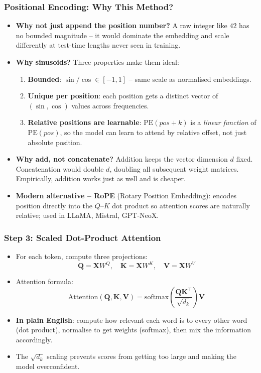 \begin{frame}[fragile]\frametitle{Positional Encoding: Why This Method?}
\begin{itemize}
\item \textbf{Why not just append the position number?}
  A raw integer like $42$ has no bounded magnitude – it would dominate the embedding
  and scale differently at test-time lengths never seen in training.
\item \textbf{Why sinusoids?} Three properties make them ideal:
  \begin{enumerate}
  \item \textbf{Bounded}: $\sin/\cos \in [-1, 1]$ – same scale as normalised embeddings.
  \item \textbf{Unique per position}: each position gets a distinct vector of
        $(\sin, \cos)$ values across frequencies.
  \item \textbf{Relative positions are learnable}: $\text{PE}(pos+k)$ is a
        \emph{linear function} of $\text{PE}(pos)$, so the model can learn
        to attend by relative offset, not just absolute position.
  \end{enumerate}
\item \textbf{Why add, not concatenate?}
  Addition keeps the vector dimension $d$ fixed.
  Concatenation would double $d$, doubling all subsequent weight matrices.
  Empirically, addition works just as well and is cheaper.
\item \textbf{Modern alternative – RoPE} (Rotary Position Embedding):
  encodes position directly into the $Q$–$K$ dot product so attention scores
  are naturally relative; used in LLaMA, Mistral, GPT-NeoX.
\end{itemize}
\end{frame}

\begin{frame}[fragile]\frametitle{Step 3: Scaled Dot-Product Attention}
\begin{itemize}
\item For each token, compute three projections:
\[
  \mathbf{Q} = \mathbf{X}W^Q, \quad \mathbf{K} = \mathbf{X}W^K, \quad \mathbf{V} = \mathbf{X}W^V
\]
\item Attention formula:
\[
  \text{Attention}(\mathbf{Q}, \mathbf{K}, \mathbf{V}) 
    = \text{softmax}\!\left(\frac{\mathbf{Q}\mathbf{K}^\top}{\sqrt{d_k}}\right)\mathbf{V}
\]
\item \textbf{In plain English}: compute how relevant each word is to every other word (dot product), normalise to get weights (softmax), then mix the information accordingly.
\item The $\sqrt{d_k}$ scaling prevents scores from getting too large and making the model overconfident.
\end{itemize}
\end{frame}


